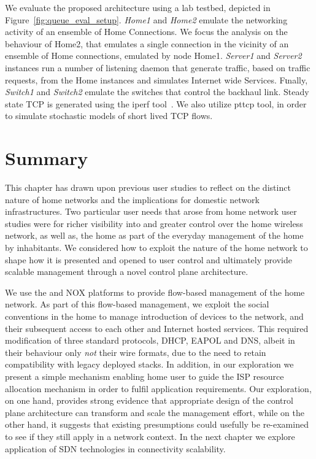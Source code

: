 We evaluate the proposed architecture using a lab testbed, depicted in
Figure~\ref{fig:queue_eval_setup}. {\it Home1} and {\it Home2} emulate the
networking activity of an ensemble of Home Connections. We focus the
analysis on the behaviour of Home2, that emulates a single connection in the
vicinity of an ensemble of Home connections, emulated by node Home1. 
{\it Server1} and {\it Server2} instances run a number of listening daemon that
generate traffic, based on traffic requests, from the Home instances and
simulates Internet wide Services. Fιnally, {\it Switch1} and {\it  Switch2}
emulate the switches that control the backhaul link. Steady state TCP is
generated using the iperf tool~\cite{iperf}. We also utilize pttcp tool, in
order to simulate stochastic models of short lived TCP flows. 


\section{Summary} \label{s:conclusion}

This chapter has drawn upon previous user studies to reflect on the distinct
nature of home networks and the implications for domestic network
infrastructures.  Two particular user needs that arose from home network user studies were
for richer visibility into and greater control over the home wireless network, as
well as, the home
as part of the everyday management of the home by inhabitants.  We  considered
how to exploit the nature of the home network to shape how it is presented and
opened to user control and ultimately provide scalable management through a
novel control plane architecture.  

We use the \ovs and NOX platforms to provide flow-based management of the home
network.  As part of this flow-based management, we exploit the social
conventions in the home to manage introduction of devices  to the network, and
their subsequent access to each other and Internet hosted services.  This
required modification of three standard protocols, DHCP, EAPOL and DNS, albeit
in their behaviour only \emph{not} their wire formats, due to the need to retain
compatibility with legacy deployed stacks. In addition, in our exploration we
present a simple mechanism enabling home user to guide the ISP resource
allocation mechanism in order to fulfil application requirements.  Our
exploration, on one hand, provides strong evidence that appropriate design of
the control plane architecture can transform and scale the management effort,
while on the other hand, it suggests that existing presumptions could usefully
be re-examined to see if they still apply in a network context.  In the next
chapter we explore application of SDN technologies in connectivity scalability. 

